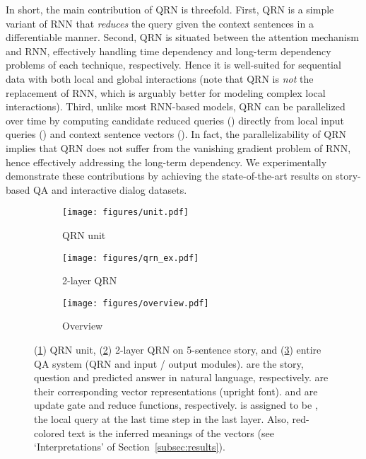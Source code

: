 \documentclass[table]{article}
\begin{document}
In short, the main contribution of QRN is threefold. 
First, QRN is a simple variant of RNN that {\it reduces} the query given the context sentences in a differentiable manner.
Second, QRN is situated between the attention mechanism and RNN, effectively handling time dependency and long-term dependency problems of each technique, respectively. 
Hence it is well-suited for sequential data with both local and global interactions (note that QRN is \emph{not} the replacement of RNN, which is arguably better for modeling complex local interactions).
Third, unlike most RNN-based models, QRN can be parallelized over time by computing candidate reduced queries () directly from local input queries () and context sentence vectors ().
In fact, the parallelizability of QRN implies that QRN does not suffer from the vanishing gradient problem of RNN, hence effectively addressing the long-term dependency.
We experimentally demonstrate these contributions by achieving the state-of-the-art results on story-based QA and interactive dialog datasets.


\begin{figure}[t]
\centering
\begin{subfigure}[htbp]{0.242\textwidth}
\texttt{[image: figures/unit.pdf]}
\caption{  QRN unit }
\label{fig:unit}
\end{subfigure}
\begin{subfigure}[htbp]{0.565\textwidth}
\centering
\texttt{[image: figures/qrn\_ex.pdf]}
\caption{2-layer QRN}
\label{fig:qrn_ex}
\end{subfigure}
\begin{subfigure}[htbp]{0.143\textwidth}
\centering
\texttt{[image: figures/overview.pdf]}
\caption{Overview}
\label{fig:overview}
\end{subfigure}
\caption{\small (\ref{fig:unit}) QRN unit, (\ref{fig:qrn_ex})  2-layer QRN on 5-sentence story, and (\ref{fig:overview}) entire QA system (QRN and input / output modules). 
     are the story, question and predicted answer in natural language, respectively.
     are their corresponding vector representations (upright font).
     and  are update gate and reduce functions, respectively.
     is  assigned to be , the local query at the last time step in the last layer.
    Also, red-colored text is the inferred meanings of the vectors (see `Interpretations' of Section~\ref{subsec:results}). }
\label{fig:model}
\end{figure}
\end{document}
